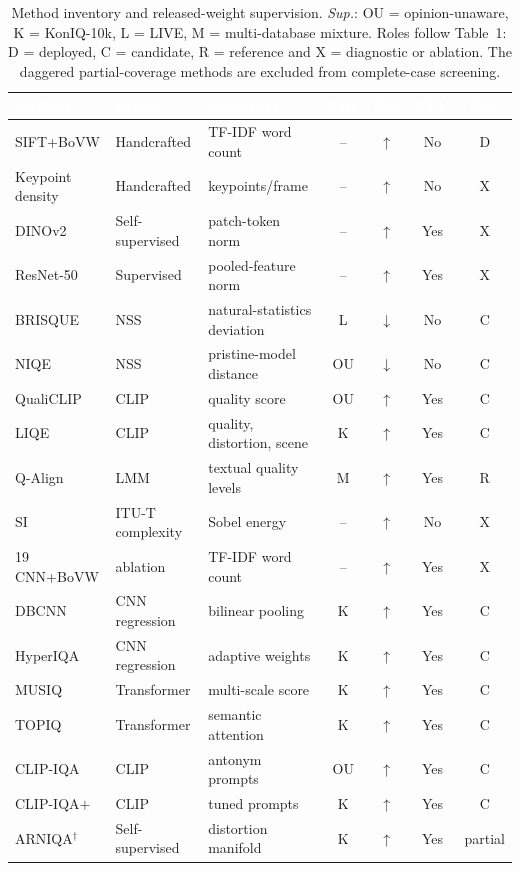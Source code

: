 \documentclass[sn-basic,Numbered]{sn-jnl}
\newcommand{\hd}[1]{\textcolor{white}{\textbf{#1}}}
\newcommand{\polup}{\ensuremath{\uparrow}}
\newcommand{\poldown}{\ensuremath{\downarrow}}
\begin{document}
\begin{table}[!ht]
\centering
\caption{Method inventory and released-weight supervision. \emph{Sup.}:
OU = opinion-unaware, K = KonIQ-10k, L = LIVE, M = multi-database mixture.
Roles follow Table~1: D = deployed, C = candidate, R = reference and X =
diagnostic or ablation. The daggered partial-coverage methods are excluded from
complete-case screening.}
\label{tab:methods_supp}
\scriptsize
\setlength{\tabcolsep}{2.5pt}
\begin{tabular}{@{}p{2.0cm}p{2.0cm}p{3.0cm}cccc@{}}
\toprule
\rowcolor{headerblue}
\hd{Method} & \hd{Family} & \hd{Construct} & \hd{Sup.} & \hd{Pol.} & \hd{GPU} & \hd{Role} \\
\midrule
SIFT+BoVW & Handcrafted & TF-IDF word count & -- & \polup & No & D \\
Keypoint density & Handcrafted & keypoints/frame & -- & \polup & No & X \\
DINOv2 & Self-supervised & patch-token norm & -- & \polup & Yes & X \\
ResNet-50 & Supervised & pooled-feature norm & -- & \polup & Yes & X \\
BRISQUE & NSS & natural-statistics deviation & L & \poldown & No & C \\
NIQE & NSS & pristine-model distance & OU & \poldown & No & C \\
QualiCLIP & CLIP & quality score & OU & \polup & Yes & C \\
LIQE & CLIP & quality, distortion, scene & K & \polup & Yes & C \\
Q-Align & LMM & textual quality levels & M & \polup & Yes & R \\
SI & ITU-T complexity & Sobel energy & -- & \polup & No & X \\
19 CNN+BoVW & ablation & TF-IDF word count & -- & \polup & Yes & X \\
DBCNN & CNN regression & bilinear pooling & K & \polup & Yes & C \\
HyperIQA & CNN regression & adaptive weights & K & \polup & Yes & C \\
MUSIQ & Transformer & multi-scale score & K & \polup & Yes & C \\
TOPIQ & Transformer & semantic attention & K & \polup & Yes & C \\
CLIP-IQA & CLIP & antonym prompts & OU & \polup & Yes & C \\
CLIP-IQA$+$ & CLIP & tuned prompts & K & \polup & Yes & C \\
ARNIQA$^{\dagger}$ & Self-supervised & distortion manifold & K & \polup & Yes & partial \\

\end{tabular}
\end{table}
\end{document}
